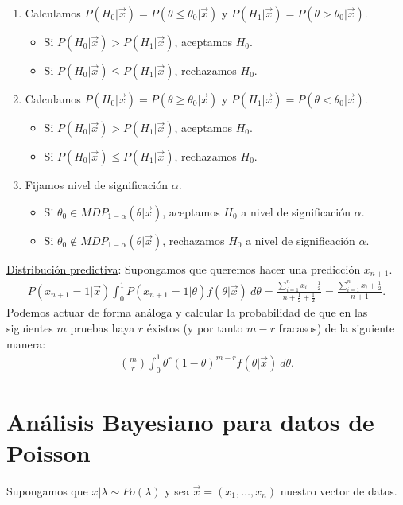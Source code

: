 \begin{enumerate}
    \item Calculamos $P(H_0 | \vec{x}) = P(\theta \leq \theta_0 |\vec{x})$ y $P(H_1 | \vec{x}) = P(\theta > \theta_0 | \vec{x})$.
          \begin{itemize}
              \item Si $P(H_0 | \vec{x}) > P(H_1 | \vec{x})$, aceptamos $H_0$.
              \item Si $P(H_0 | \vec{x}) \leq P(H_1 | \vec{x})$, rechazamos $H_0$.
          \end{itemize}
    \item Calculamos $P(H_0 | \vec{x}) = P(\theta \ge \theta_0 |\vec{x})$ y $P(H_1 | \vec{x}) = P(\theta < \theta_0 | \vec{x})$.
          \begin{itemize}
              \item Si $P(H_0 | \vec{x}) > P(H_1 | \vec{x})$, aceptamos $H_0$.
              \item Si $P(H_0 | \vec{x}) \leq P(H_1 | \vec{x})$, rechazamos $H_0$.
          \end{itemize}
    \item Fijamos nivel de significación $\alpha$.
          \begin{itemize}
              \item Si $\theta_0 \in MDP_{1 - \alpha}(\theta | \vec{x})$, aceptamos $H_0$ a nivel de significación $\alpha$.
              \item Si $\theta_0 \not\in MDP_{1 - \alpha}(\theta | \vec{x})$, rechazamos $H_0$ a nivel de significación $\alpha$.
          \end{itemize}
\end{enumerate}
\underline{Distribución predictiva}: Supongamos que queremos hacer una predicción $x_{n+1}$.
\begin{align*}
    P(x_{n+1} = 1 | \vec{x}) \int_{0}^{1} P(x_{n+1} = 1 | \theta) f(\theta | \vec{x}) \ d\theta = \frac{\sum_{i=1}^{n} x_i + \frac{1}{2}}{n+\frac{1}{2} + \frac{1}{2}} = \frac{\sum_{i=1}^{n} x_i + \frac{1}{2}}{n+1}.
\end{align*}
Podemos actuar de forma análoga y calcular la probabilidad de que en las siguientes $m$ pruebas haya $r$ éxistos (y por tanto $m-r$ fracasos) de la siguiente manera:
\begin{align*}
    \binom{m}{r} \int_{0}^{1} \theta^r(1 - \theta)^{m-r} f(\theta | \vec{x}) \ d\theta.
\end{align*}

\section{Análisis Bayesiano para datos de Poisson}
Supongamos que $x | \lambda \sim Po(\lambda)$ y sea $\vec{x} = (x_1, \ldots, x_n)$ nuestro vector de datos.

